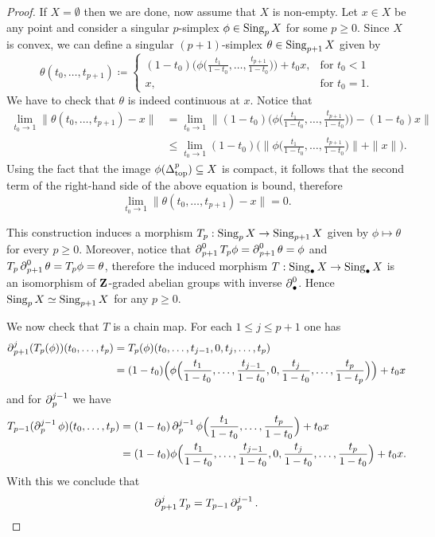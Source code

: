 \begin{proof}
If \(X = \emptyset\) then we are done, now assume that \(X\) is non-empty. Let \(x \in X\)
be any point and consider a singular \(p\)-simplex \(\phi \in \operatorname{Sing}_p X\) for some
\(p \geq 0\). Since \(X\) is convex, we can define a singular \((p+1)\)-simplex \(\theta
\in \operatorname{Sing}_{p+1} X\) given by
\[
\theta(t_0, \dots, t_{p+1}) \coloneq
\begin{cases}
  (1 - t_0) \Big(\phi\Big( \frac{t_{1}}{1 - t_{0}}, \dots, \frac{t_{p+1}}{1 - t_0}
  \Big)\Big) + t_0 x, &\text{for } t_0 < 1 \\
  x, &\text{for } t_0 = 1.
\end{cases}
\]
We have to check that \(\theta\) is indeed continuous at \(x\). Notice that
\begin{align*}
  \lim_{t_0 \to 1} \| \theta(t_0, \dots, t_{p+1}) - x \|
  &= \lim_{t_0 \to 1} \Big\| (1 - t_0)
  \Big(\phi\Big( \frac{t_{1}}{1 - t_{0}}, \dots, \frac{t_{p+1}}{1 - t_0} \Big)\Big)
  - (1 - t_0) x
  \Big\| \\
  &\leq \lim_{t_0 \to 1} (1 - t_0) \Big( \Big\|
    \phi\Big( \frac{t_{1}}{1 - t_{0}}, \dots, \frac{t_{p+1}}{1 - t_0} \Big)
    \Big\|
    + \| x \|
    \Big).
\end{align*}
Using the fact that the image \(\phi(\Delta_{\text{top}}^p) \subseteq X\) is compact, it follows that
the second term of the right-hand side of the above equation is bound, therefore
\[
\lim_{t_0 \to 1} \| \theta(t_{0}, \dots, t_{p+1}) - x \| = 0.
\]

This construction induces a morphism \(T_p: \operatorname{Sing}_p X \to \operatorname{Sing}_{p+1} X\) given by
\(\phi \mapsto \theta\) for every \(p \geq 0\). Moreover, notice that
\(\operatorname{\partial}_{p+1}^0 T_p \phi = \operatorname{\partial}_{p+1}^0 \theta = \phi\) and
\(T_p \operatorname{\partial}_{p+1}^0 \theta = T_p \phi = \theta\), therefore the induced morphism
\(T: \operatorname{Sing}_{\bullet} X \to \operatorname{Sing}_{\bullet} X\) is an isomorphism of
\(\mathbf{Z}\)-graded abelian groups with inverse \(\operatorname{\partial}_{\bullet}^0\). Hence
\(\operatorname{Sing}_p X \simeq \operatorname{Sing}_{p + 1} X\) for any \(p \geq 0\).

We now check that \(T\) is a chain map. For each
\(1 \leq j \leq p+1\) one has
\begin{align*}
  \operatorname{\partial}_{p+1}^j (T_p(\phi))(t_0, \dots, t_p)
  &= T_p(\phi)(t_0, \dots, t_{j-1}, 0, t_j, \dots, t_p) \\
  &= (1 - t_0) \Big(
      \phi\Big(
      \frac{t_{1}}{1 - t_{0}}, \dots, \frac{t_{j-1}}{1 - t_0}, 0,
      \frac{t_{j}}{1 - t_0}, \dots, \frac{t_{p}}{1 - t_{p}}
      \Big)
    \Big) + t_0 x
\end{align*}
and for \(\operatorname{\partial}_p^{j-1}\) we have
\begin{align*}
  T_{p-1}(\operatorname{\partial}_p^{j-1} \phi)(t_0, \dots, t_{p})
  &= (1 - t_0) \operatorname{\partial}_p^{j-1} \phi\Big(
      \frac{t_{1}}{1 - t_0}, \dots, \frac{t_{p}}{1 - t_{0}}
    \Big) + t_0 x \\
  &= (1 - t_0) \phi\Big(
      \frac{t_{1}}{1 - t_{0}}, \dots, \frac{t_{j-1}}{1 - t_{0}}, 0,
      \frac{t_j}{1 - t_0}, \dots, \frac{t_{p}}{1 - t_0}
    \Big) + t_0 x.
\end{align*}
With this we conclude that
\[
\operatorname{\partial}_{p+1}^j T_p = T_{p-1} \operatorname{\partial}_p^{j-1}.
\]


\end{proof}
